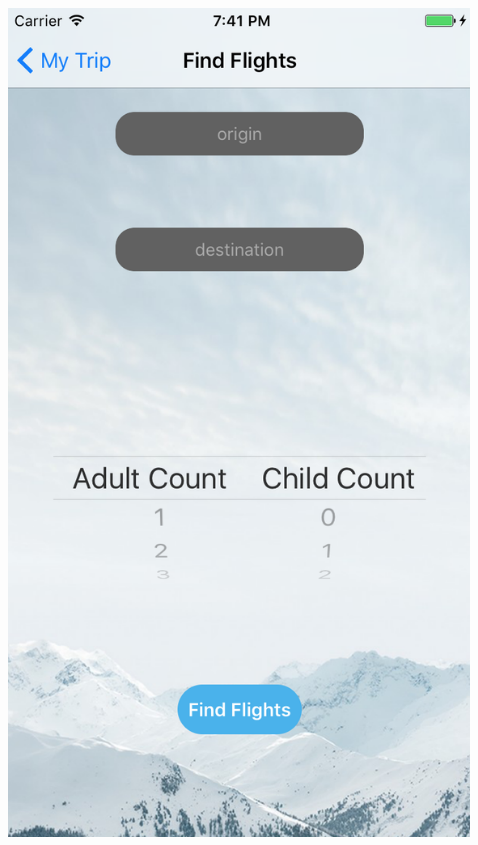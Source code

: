 \documentclass{beamer}
\begin{document}
\begin{frame}
\begin{columns}
\begin{column}{0.3\textwidth}
\begin{center}
        \end{center}
    \end{column}
    \begin{column}{0.3\textwidth}  %
        \begin{center}
            \includegraphics[scale=0.3]{flightSearch}
        \end{center}
    \end{column}
    \begin{column}{0.3\textwidth}  %

\end{column}
\end{columns}
\end{frame}
\end{document}
